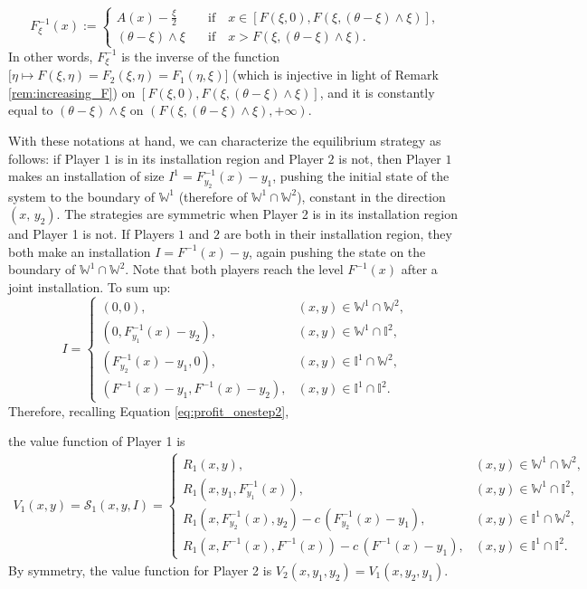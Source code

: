 \documentclass[10pt]{article}
\numberwithin{equation}{section}
\theoremstyle{plain}
\numberwithin{theorem}{section}
\theoremstyle{definition}
\newcommand{\<}{\langle}
\renewcommand{\>}{\rangle}
\renewcommand{\(}{\left(}
\renewcommand{\)}{\right)}
\begin{document}
{{\begin{equation}
{F}_{\xi}^{-1}(x):= \begin{cases}
A(x)-\frac{\xi}{2} &\quad \text{if}\quad x\in [{F}(\xi,0),{F}(\xi,{(\theta-\xi)\wedge \xi})],\\ 
(\theta-\xi)\wedge \xi  & \quad \text{if}\quad x> {F}({\xi,(\theta-\xi)\wedge \xi})  .
\end{cases}
\end{equation}
In other words, ${F}_{\xi}^{-1}$ is the inverse of the function $\big[\eta\mapsto F(\xi,\eta) =F_2(\xi,\eta) =F_1(\eta,\xi)\big]$ (which is injective in light of Remark \ref{rem:increasing_F}) on $[F(\xi,0),F({\xi,(\theta-\xi)\wedge \xi})]$, and it is constantly equal to ${(\theta-\xi)\wedge \xi}$ on $(F({\xi,(\theta-\xi)\wedge \xi}),+\infty)$.

With these notations at hand, we can characterize the equilibrium strategy as follows: 
if {Player $1$} is in its installation region and {Player $2$} is not, then Player $1$ makes an installation of {size $I^1={F}^{-1}_{y_2}(x)-y_1$}, pushing the initial state of the system to the boundary of $\mathbb{W}^1$ (therefore of $\mathbb{W}^1\cap \mathbb{W}^2$), constant in the direction $(x, \, y_2)$. {The strategies are symmetric when Player 2 is in its installation region and Player 1 is not}. If {Players $1$ and $2$} are both in their installation region, they both make an installation $I={F}^{-1}(x)-y$, again pushing the state on the boundary of {$\mathbb{W}^1\cap \mathbb{W}^2$. Note that both players reach the level ${F}^{-1}(x)$ after a joint installation.} {To sum up:
\begin{equation}\label{eq:eq_strat_one_s}
I=\begin{cases}
(0,0), & (x,y)\in \mathbb{W}^1\cap \mathbb{W}^2,\\
(0, {F}^{-1}_{y_1}(x)-y_2), & (x,y)\in \mathbb{W}^1\cap \mathbb{I}^2, \\
({F}^{-1}_{y_2}(x)-y_1 , 0), & (x,y)\in \mathbb{I}^1\cap \mathbb{W}^2, \\
({F}^{-1}(x)-y_1, {F}^{-1}(x)-y_2), & (x,y)\in \mathbb{I}^1\cap \mathbb{I}^2.
\end{cases}
\end{equation}
}
Therefore, recalling Equation \eqref{eq:profit_onestep2}, {the value function of Player 1 is %
\begin{align}
V_1(x,y) = \mathcal{S}_1(x,y,I)=\begin{cases}
R_1(x,y), & (x,y)\in \mathbb{W}^1\cap \mathbb{W}^2,\\
R_1(x,y_1, {F}_{y_1}^{-1}(x) ), & (x,y)\in \mathbb{W}^1\cap \mathbb{I}^2, \\
R_1(x,{F}_{y_2}^{-1}(x) , y_2) - c\, ({F}_{y_2}^{-1}(x) - y_1), & (x,y)\in \mathbb{I}^1\cap \mathbb{W}^2, \\
R_1(x,{F}^{-1}(x),{F}^{-1}(x))-c\,({F}^{-1}(x)-y_1), & (x,y)\in \mathbb{I}^1\cap \mathbb{I}^2.
\end{cases}\label{eq:value_onestep}
\end{align}
{By symmetry, the value function for Player 2 is $V_2(x,y_1,y_2) =V_1(x,y_2,y_1) $.}

}}}
\end{document}

